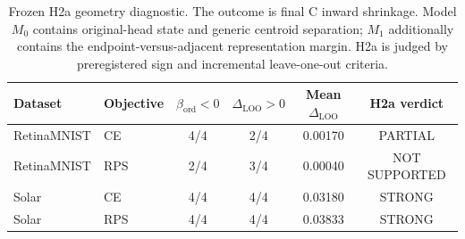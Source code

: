 \begin{table}[t]
\centering
\caption{Frozen H2a geometry diagnostic. The outcome is final C inward shrinkage. Model $M_0$ contains original-head state and generic centroid separation; $M_1$ additionally contains the endpoint-versus-adjacent representation margin. H2a is judged by preregistered sign and incremental leave-one-out criteria.}
\label{tab:confirmatory-h2a}
\small
\begin{tabular}{llcccc}
\toprule
Dataset & Objective & $\hat\beta_{\mathrm{ord}}<0$ & $\Delta_{\mathrm{LOO}}>0$ & Mean $\Delta_{\mathrm{LOO}}$ & H2a verdict \\
\midrule
RetinaMNIST & CE  & 4/4 & 2/4 & 0.00170 & PARTIAL \\
RetinaMNIST & RPS & 2/4 & 3/4 & 0.00040 & NOT SUPPORTED \\
Solar & CE       & 4/4 & 4/4 & 0.03180 & STRONG \\
Solar & RPS      & 4/4 & 4/4 & 0.03833 & STRONG \\
\bottomrule
\end{tabular}
\end{table}
